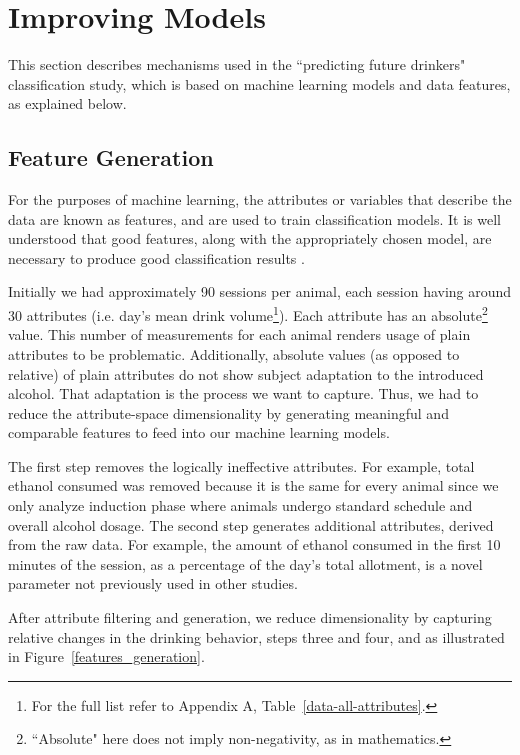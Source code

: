 \section{Improving Models}		
	This section describes mechanisms used in the ``predicting future drinkers" classification study, which is based on machine learning models and data features, as explained below.
	
	\subsection{Feature Generation \label{section:feature-generation}}
	For the purposes of machine learning, the attributes or variables that describe the data are known as features, and are used to train classification models. It is well understood that good features, along with the appropriately chosen model, are necessary to produce good classification results . 
	
	Initially we had approximately 90 sessions per animal, each session having around 30 attributes (i.e. day's mean drink volume\footnote{For the full list refer to Appendix A, Table~\ref{data-all-attributes}.}). Each attribute has an absolute\footnote{``Absolute" here does not imply non-negativity, as in mathematics.}  value. This number of measurements for each animal renders usage of plain attributes to be problematic. Additionally, absolute values (as opposed to relative) of plain attributes do not show subject adaptation to the introduced alcohol. That adaptation is the process we want to capture. Thus, we had to reduce the attribute-space dimensionality by generating meaningful and comparable features to feed into our machine learning models. 
	
	The first step removes the logically ineffective attributes. For example, total ethanol consumed was removed because it is the same for every animal since we only analyze induction phase where animals undergo standard schedule and overall alcohol dosage. The second step generates additional attributes, derived from the raw data. For example, the amount of ethanol consumed in the first 10 minutes of the session, as a percentage of the day's total allotment, is a novel parameter not previously used in other studies. 
	
	After attribute filtering and generation, we reduce dimensionality by capturing relative changes in the drinking behavior, steps three and four, and as illustrated in Figure~\ref{features_generation}.
		
